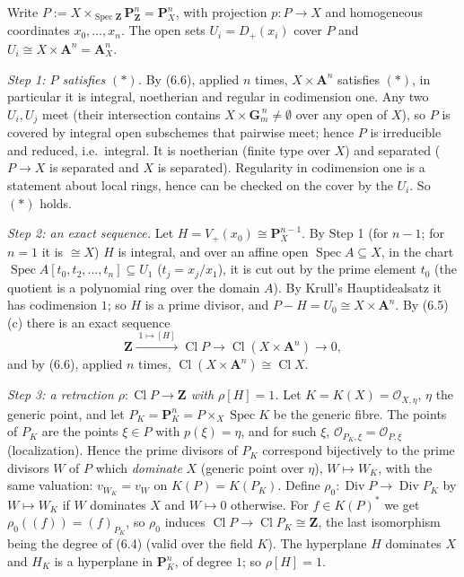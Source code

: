 \documentclass[11pt]{article}
\begin{document}
\pf
Write $P:=X\times_{\operatorname{Spec}\mathbf Z}\mathbf P^n_{\mathbf Z}=\mathbf P^n_X$, with projection $p:P\to X$ and homogeneous coordinates $x_0,\dots,x_n$. The open sets $U_i=D_+(x_i)$ cover $P$ and $U_i\cong X\times\mathbf A^n=\mathbf A^n_X$.

\emph{Step 1: $P$ satisfies $(*)$.} By (6.6), applied $n$ times, $X\times\mathbf A^n$ satisfies $(*)$, in particular it is integral, noetherian and regular in codimension one. Any two $U_i,U_j$ meet (their intersection contains $X\times\mathbf G_m^{\,n}\neq\emptyset$ over any open of $X$), so $P$ is covered by integral open subschemes that pairwise meet; hence $P$ is irreducible and reduced, i.e.\ integral. It is noetherian (finite type over $X$) and separated ($P\to X$ is separated and $X$ is separated). Regularity in codimension one is a statement about local rings, hence can be checked on the cover by the $U_i$. So $(*)$ holds.

\emph{Step 2: an exact sequence.} Let $H=V_+(x_0)\cong\mathbf P^{n-1}_X$. By Step 1 (for $n-1$; for $n=1$ it is $\cong X$) $H$ is integral, and over an affine open $\operatorname{Spec}A\subseteq X$, in the chart $\operatorname{Spec}A[t_0,t_2,\dots,t_n]\subseteq U_1$ ($t_j=x_j/x_1$), it is cut out by the prime element $t_0$ (the quotient is a polynomial ring over the domain $A$). By Krull's Hauptidealsatz it has codimension $1$; so $H$ is a prime divisor, and $P-H=U_0\cong X\times\mathbf A^n$. By (6.5)(c) there is an exact sequence
\[
\mathbf Z\xrightarrow{\;1\mapsto[H]\;}\operatorname{Cl}P\longrightarrow\operatorname{Cl}(X\times\mathbf A^n)\to0,
\]
and by (6.6), applied $n$ times, $\operatorname{Cl}(X\times\mathbf A^n)\cong\operatorname{Cl}X$.

\emph{Step 3: a retraction $\rho:\operatorname{Cl}P\to\mathbf Z$ with $\rho[H]=1$.} Let $K=K(X)=\mathcal O_{X,\eta}$, $\eta$ the generic point, and let $P_K=\mathbf P^n_K=P\times_X\operatorname{Spec}K$ be the generic fibre. The points of $P_K$ are the points $\xi\in P$ with $p(\xi)=\eta$, and for such $\xi$, $\mathcal O_{P_K,\xi}=\mathcal O_{P,\xi}$ (localization). Hence the prime divisors of $P_K$ correspond bijectively to the prime divisors $W$ of $P$ which \emph{dominate} $X$ (generic point over $\eta$), $W\mapsto W_K$, with the same valuation: $v_{W_K}=v_W$ on $K(P)=K(P_K)$. Define $\rho_0:\operatorname{Div}P\to\operatorname{Div}P_K$ by $W\mapsto W_K$ if $W$ dominates $X$ and $W\mapsto 0$ otherwise. For $f\in K(P)^*$ we get $\rho_0((f))=(f)_{P_K}$, so $\rho_0$ induces $\operatorname{Cl}P\to\operatorname{Cl}P_K\cong\mathbf Z$, the last isomorphism being the degree of (6.4) (valid over the field $K$). The hyperplane $H$ dominates $X$ and $H_K$ is a hyperplane in $\mathbf P^n_K$, of degree $1$; so $\rho[H]=1$.
\end{document}
